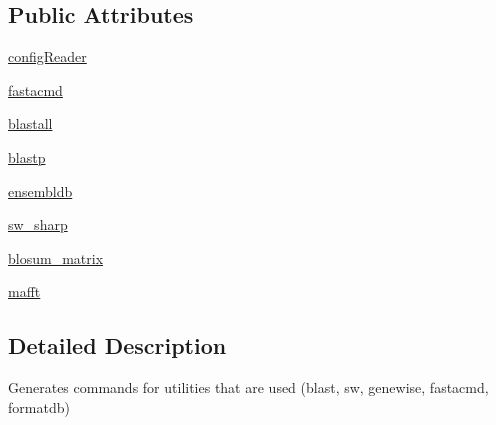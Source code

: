 \subsection*{Public Attributes}
\begin{DoxyCompactItemize}
\item 
\hyperlink{classel__utils_1_1almt__cmd__generator_1_1AlignmentCommandGenerator_aa7d2a8c8a68145b3c0f3090f80429faf}{config\-Reader}
\item 
\hyperlink{classel__utils_1_1almt__cmd__generator_1_1AlignmentCommandGenerator_a46fa405dc7239f748c9c692c8ca3c2f0}{fastacmd}
\item 
\hyperlink{classel__utils_1_1almt__cmd__generator_1_1AlignmentCommandGenerator_a73be9ae4d541e6fb5949ef09f218507c}{blastall}
\item 
\hyperlink{classel__utils_1_1almt__cmd__generator_1_1AlignmentCommandGenerator_af8427fa486583a801181461634c926b3}{blastp}
\item 
\hyperlink{classel__utils_1_1almt__cmd__generator_1_1AlignmentCommandGenerator_ac18b451ce8c2540407718b39092282e9}{ensembldb}
\item 
\hyperlink{classel__utils_1_1almt__cmd__generator_1_1AlignmentCommandGenerator_a2710471bddfbc19d7f1f25d988e4b0e2}{sw\-\_\-sharp}
\item 
\hyperlink{classel__utils_1_1almt__cmd__generator_1_1AlignmentCommandGenerator_a1d6cd9483bdb772e78adc7ce759d9010}{blosum\-\_\-matrix}
\item 
\hyperlink{classel__utils_1_1almt__cmd__generator_1_1AlignmentCommandGenerator_ad71173d1c2ed92b3c19321c963997599}{mafft}
\end{DoxyCompactItemize}


\subsection{Detailed Description}
Generates commands for utilities that are used (blast, sw, genewise, fastacmd, formatdb) 

